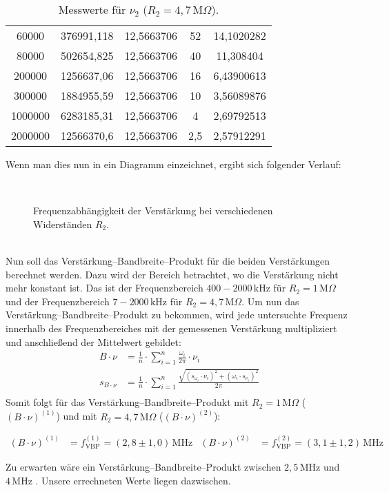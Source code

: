 \begin{table}[htbp]
\begin{tabular}{c||c|c|c|c}
      60000 & 376991,118 & 12,5663706 & 52 & 14,1020282 \\
      80000 & 502654,825 & 12,5663706 & 40 & 11,308404 \\
      200000 & 1256637,06 & 12,5663706 & 16 & 6,43900613 \\
      300000 & 1884955,59 & 12,5663706 & 10 & 3,56089876 \\
      1000000 & 6283185,31 & 12,5663706 & 4 & 2,69792513 \\
      2000000 & 12566370,6 & 12,5663706 & 2,5 & 2,57912291 \\
      \end{tabular}%
      \caption{Messwerte für $\nu_2$ ($R_2=4,7\,\text{M}\Omega$).}
  \end{table}\newpage
Wenn man dies nun in ein Diagramm einzeichnet, ergibt sich folgender Verlauf:
\begin{figure}[h]
    \centering\subfigure[$R_2=1\,\text{M}\Omega$]{\scalebox{1}{}}\\
    \centering\subfigure[$R_2=4,7\,\text{M}\Omega$]{\scalebox{1}{}}
    \caption{Frequenzabhängigkeit der Verstärkung bei verschiedenen Widerständen $R_2$.}
\end{figure}\\
Nun soll das Verstärkung–Bandbreite–Produkt für die beiden Verstärkungen berechnet werden.
Dazu wird der Bereich betrachtet, wo die Verstärkung nicht mehr konstant ist.
Das ist der Frequenzbereich $400-2000\,\text{kHz}$ für $R_2=1\,\text{M}\Omega$ und der Frequenzbereich $7-2000\,\text{kHz}$ für $R_2=4,7\,\text{M}\Omega$.\newpage
Um nun das Verstärkung–Bandbreite–Produkt zu bekommen, wird jede untersuchte Frequenz innerhalb des Frequenzbereiches mit der gemessenen Verstärkung multipliziert und anschließend der Mittelwert gebildet:
\begin{align}
    B\cdot\nu&=\frac{1}{n}\cdot\sum_{i=1}^n\frac{\omega_i}{2\pi}\cdot\nu_i\\
    s_{B\cdot\nu}&=\frac{1}{n}\cdot\sum_{i=1}^n\frac{\sqrt{\left(s_{\omega_i}\cdot\nu_i\right)^2+\left(\omega_i\cdot s_{\nu_i}\right)^2}}{2\pi}\\
\end{align}
Somit folgt für das Verstärkung–Bandbreite–Produkt mit $R_2=1\,\text{M}\Omega$ ($\left(B\cdot\nu\right)^{(1)}$) und mit $R_2=4,7\,\text{M}\Omega$ ($\left(B\cdot\nu\right)^{(2)}$):
\begin{framed}
    \begin{align}
        \left(B\cdot\nu\right)^{(1)}&=f_\text{VBP}^{(1)}=\left(2,8\pm1,0\right)\,\text{MHz} & \left(B\cdot\nu\right)^{(2)}&=f_\text{VBP}^{(2)}=\left(3,1\pm1,2\right)\,\text{MHz}
    \end{align}
\end{framed}
Zu erwarten wäre ein Verstärkung–Bandbreite–Produkt zwischen $2,5\,\text{MHz}$ und $4\,\text{MHz}$ \citep[vgl.][S.6]{tl071}.
Unsere errechneten Werte liegen dazwischen.\newpage
